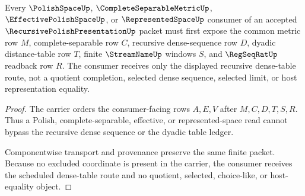 \begin{theorem}
\label{thm:recursive-polish-presentation-dense-table-handoff}
Every $\PolishSpaceUp$, $\CompleteSeparableMetricUp$, $\EffectivePolishSpaceUp$, or $\RepresentedSpaceUp$ consumer of an accepted $\RecursivePolishPresentationUp$ packet must first expose the common metric row $M$, complete-separable row $C$, recursive dense-sequence row $D$, dyadic distance-table row $T$, finite $\StreamNameUp$ windows $S$, and $\RegSeqRatUp$ readback row $R$. The consumer receives only the displayed recursive dense-table route, not a quotient completion, selected dense sequence, selected limit, or host representation equality.
\end{theorem}
\begin{proof}
The carrier orders the consumer-facing rows $A,E,V$ after $M,C,D,T,S,R$. Thus a Polish, complete-separable, effective, or represented-space read cannot bypass the recursive dense sequence or the dyadic table ledger.

Componentwise transport and provenance preserve the same finite packet. Because no excluded coordinate is present in the carrier, the consumer receives the scheduled dense-table route and no quotient, selected, choice-like, or host-equality object.
\end{proof}




